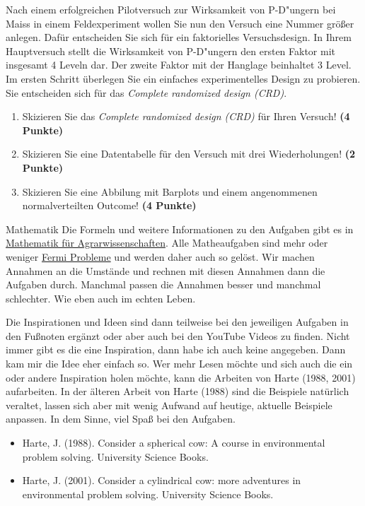 \documentclass[a4paper, 9pt]{scrartcl}\usepackage[]{graphicx}\usepackage[]{xcolor}
\begin{document}
Nach einem erfolgreichen Pilotversuch zur Wirksamkeit von P-D{"u}ngern bei
Maiss in einem Feldexperiment wollen Sie nun den Versuch eine Nummer gr{\"o}{\ss}er
anlegen. Daf{\"u}r entscheiden Sie sich f{\"u}r ein faktorielles Versuchsdesign. In
Ihrem Hauptversuch stellt die Wirksamkeit von P-D{"u}ngern den ersten Faktor
mit insgesamt 4 Leveln dar. Der zweite Faktor mit der Hanglage
beinhaltet
3 Level. \\

Im ersten Schritt {\"u}berlegen Sie ein einfaches experimentelles Design zu
probieren. Sie entscheiden sich f{\"u}r das \textit{Complete randomized design (CRD)}.

\begin{enumerate}
  \setcounter{enumi}{0}
\item Skizieren Sie das \textit{Complete randomized design (CRD)} f{\"u}r Ihren Versuch!
  \textbf{(4 Punkte)}
\item Skizieren Sie eine Datentabelle f{\"u}r den Versuch mit drei
  Wiederholungen! \textbf{(2 Punkte)}
\item Skizieren Sie eine Abbilung mit Barplots und einem angenommenen
  normalverteilten Outcome! \textbf{(4 Punkte)}
\end{enumerate}


 
\clearpage
\begin{graybox}{Mathematik}
Die Formeln und weitere Informationen zu den Aufgaben gibt es in \href{https://jkruppa.github.io/math/}{Mathematik für Agrarwissenschaften}. Alle Matheaufgaben sind mehr oder weniger \href{https://de.wikipedia.org/wiki/Fermi-Problem}{Fermi Probleme} und werden daher auch so gelöst. Wir machen Annahmen an die Umstände und rechnen mit diesen Annahmen dann die Aufgaben durch. Manchmal passen die Annahmen besser und manchmal schlechter. Wie eben auch im echten Leben.

Die Inspirationen und Ideen sind dann teilweise bei den jeweiligen Aufgaben in den Fußnoten ergänzt oder aber auch bei den YouTube Videos zu finden. Nicht immer gibt es die eine Inspiration, dann habe ich auch keine angegeben. Dann kam mir die Idee eher einfach so. Wer mehr Lesen möchte und sich auch die ein oder andere Inspiration holen möchte, kann die Arbeiten von Harte (1988, 2001) aufarbeiten. In der älteren Arbeit von Harte (1988) sind die Beispiele natürlich veraltet, lassen sich aber mit wenig Aufwand auf heutige, aktuelle Beispiele anpassen. In dem Sinne, viel Spaß bei den Aufgaben.

\begin{itemize}
\item Harte, J. (1988). Consider a spherical cow: A course in environmental problem solving. University Science Books.
\item Harte, J. (2001). Consider a cylindrical cow: more adventures in environmental problem solving. University Science Books.
\end{itemize}
\end{graybox}
\clearpage
\end{document}
